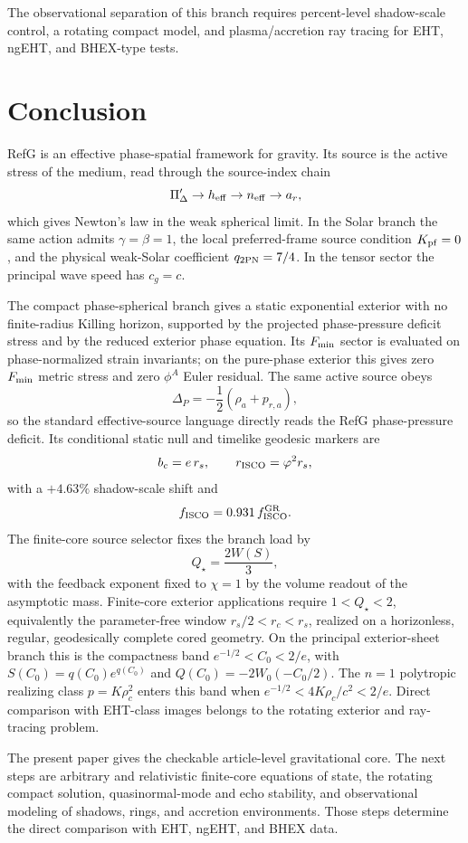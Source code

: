 \documentclass[12pt,a4paper]{article}
\begin{document}
The observational separation of this branch requires percent-level shadow-scale control, a rotating compact model, and plasma/accretion ray tracing for EHT, ngEHT, and BHEX-type tests.

\section{Conclusion}

RefG is an effective phase-spatial framework for gravity. Its source is the active stress of the medium, read through the source-index chain
\[
\Pi_\Delta'\rightarrow h_{\rm eff}\rightarrow n_{\rm eff}\rightarrow a_r,
\]
which gives Newton's law in the weak spherical limit. In the Solar branch the same action admits $\gamma=\beta=1$, the local preferred-frame source condition $K_{\rm pf}=0$, and the physical weak-Solar coefficient $q_{2{\rm PN}}=7/4$. In the tensor sector the principal wave speed has $c_g=c$.

The compact phase-spherical branch gives a static exponential exterior with no
finite-radius Killing horizon, supported by the projected phase-pressure
deficit stress and by the reduced exterior phase equation. Its $F_{\rm min}$
sector is evaluated on phase-normalized strain invariants; on the pure-phase
exterior this gives zero $F_{\rm min}$ metric stress and zero $\phi^A$ Euler
residual. The same active source obeys
\[
\Delta_P=-\frac{1}{2}\left(\rho_a+p_{r,a}\right),
\]
so the standard effective-source language directly reads the RefG
phase-pressure deficit. Its conditional static null and timelike geodesic
markers are
\[
b_c=e\,r_s,\qquad
r_{\rm ISCO}=\varphi^2r_s,
\]
with a $+4.63\%$ shadow-scale shift and
\[
f_{\rm ISCO}=0.931\,f_{\rm ISCO}^{\rm GR}.
\]
The finite-core source selector fixes the branch load by
\[
Q_\star=\frac{2W(S)}{3},
\]
with the feedback exponent fixed to $\chi=1$ by the volume readout of the
asymptotic mass.  Finite-core exterior applications require $1<Q_\star<2$,
equivalently the parameter-free window $r_s/2<r_c<r_s$, realized on a
horizonless, regular, geodesically complete cored geometry.  On the
principal exterior-sheet branch this is the compactness band
$e^{-1/2}<C_0<2/e$, with
$S(C_0)=q(C_0)e^{q(C_0)}$ and
$Q(C_0)=-2W_0(-C_0/2)$.  The $n=1$ polytropic realizing class
$p=K\rho_c^2$ enters this band when
$e^{-1/2}<4K\rho_c/c^2<2/e$.  Direct comparison with EHT-class images belongs
to the rotating exterior and ray-tracing problem.

The present paper gives the checkable article-level gravitational core. The
next steps are arbitrary and relativistic finite-core equations of state, the
rotating compact solution, quasinormal-mode and echo stability, and
observational modeling of shadows, rings, and accretion environments. Those
steps determine the direct comparison with EHT, ngEHT, and BHEX data.
\end{document}
